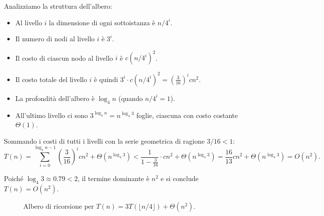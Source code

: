 \begin{esempio}[Albero di ricorsione per $T(n) = 3T(\lfloor n/4 \rfloor) + \Theta(n^2)$]
	Analizziamo la struttura dell'albero:
	\begin{itemize}
		\item Al livello $i$ la dimensione di ogni sottoistanza è $n/4^i$.
		\item Il numero di nodi al livello $i$ è $3^i$.
		\item Il costo di ciascun nodo al livello $i$ è $c(n/4^i)^2$.
		\item Il costo totale del livello $i$ è quindi $3^i \cdot c(n/4^i)^2 = \left(\frac{3}{16}\right)^i cn^2$.
		\item La profondità dell'albero è $\log_4 n$ (quando $n/4^i = 1$).
		\item All'ultimo livello ci sono $3^{\log_4 n} = n^{\log_4 3}$ foglie, ciascuna con costo costante $\Theta(1)$.
	\end{itemize}
	
	Sommando i costi di tutti i livelli con la serie geometrica di ragione $3/16 < 1$:
	\[
	T(n) = \sum_{i=0}^{\log_4 n - 1} \left(\frac{3}{16}\right)^i cn^2 + \Theta(n^{\log_4 3})
	< \frac{1}{1 - \frac{3}{16}} \cdot cn^2 + \Theta(n^{\log_4 3})
	= \frac{16}{13} cn^2 + \Theta(n^{\log_4 3})
	= O(n^2).
	\]
	
	Poiché $\log_4 3 \approx 0.79 < 2$, il termine dominante è $n^2$ e si conclude $T(n) = O(n^2)$.
\end{esempio}

\begin{figure}[H]
	\centering
	\caption{Albero di ricorsione per $T(n)=3T(\lfloor n/4\rfloor)+\Theta(n^2)$.}
\end{figure}

